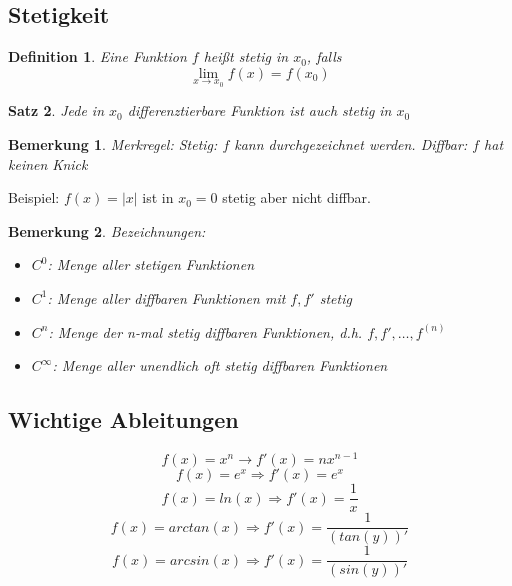 \documentclass[12pt,a4paper]{report}%
\newtheorem{satz}{Satz}[section]
\newtheorem{definition}[satz]{Definition}
\newtheorem{bem}{Bemerkung}[section]
\numberwithin{equation}{section}
\numberwithin{equation}{subsection}
\begin{document}
  \subsection{Stetigkeit}
  \begin{definition}
    Eine Funktion $f$ heißt stetig in $x_0$, falls 
    \begin{equation}
      \lim_{x \rightarrow x_0} f(x) = f(x_0)
    \end{equation}
  \end{definition}
  \begin{satz}
    Jede in $x_0$ differenztierbare Funktion ist auch stetig in $x_0$  
  \end{satz}
  \begin{bem}
    Merkregel:\newline
    Stetig: $f$ kann durchgezeichnet werden.\newline
    Diffbar: $f$ hat keinen Knick
  \end{bem}
  Beispiel:\newline
  $f(x) = |x|$ ist in $x_0 = 0$ stetig aber nicht diffbar.
  \begin{bem}
    Bezeichnungen:
    \begin{itemize}
      \item $C^0$: Menge aller stetigen Funktionen
      \item $C^1$: Menge aller diffbaren Funktionen mit $f,f'$ stetig
      \item $C^n$: Menge der n-mal stetig diffbaren Funktionen, d.h. $f, f', \dots, f^{(n)}$
      \item $C^{\infty}$: Menge aller unendlich oft stetig diffbaren Funktionen
    \end{itemize}
  \end{bem}
  \subsection{Wichtige Ableitungen}
  \begin{equation}
    f(x) = x^n \rightarrow f'(x) = nx^{n-1}
  \end{equation}
  \begin{equation}
    f(x) = e^x \Rightarrow f'(x) = e^x
  \end{equation}
  \begin{equation}
    f(x) = ln(x) \Rightarrow f'(x) = \frac{1}{x}
  \end{equation}
  \begin{equation}
    f(x) = arctan(x) \Rightarrow f'(x) = \frac{1}{(tan(y))'}
  \end{equation}
  \begin{equation}
    f(x) = arcsin(x) \Rightarrow f'(x) = \frac{1}{(sin(y))'}
  \end{equation}
\end{document}
